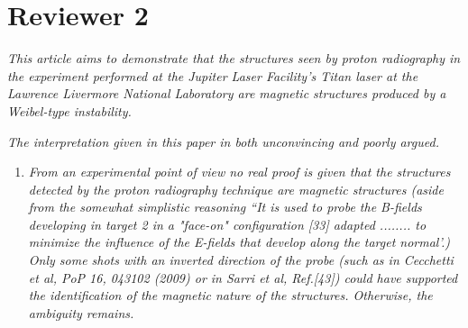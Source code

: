 \documentclass[aps,showpacs,superscriptaddress]{revtex4}%
\begin{document}
\section{Reviewer 2}

\textit{This article aims to demonstrate that the structures seen by proton radiography in the experiment performed at the Jupiter Laser Facility's Titan laser at the Lawrence Livermore National Laboratory are magnetic structures produced by a Weibel-type instability.}

\textit{
The interpretation given in this paper in both unconvincing and poorly argued.}
\begin{enumerate}
\item \textit{From an experimental point of view no real proof is given that the structures detected by the proton radiography technique are magnetic structures (aside from the somewhat simplistic reasoning ``It is used to probe the B-fields developing in target 2 in a "face-on" configuration [33] adapted ........ to minimize the influence of the E-fields that develop along the target normal'.)
Only some shots with an inverted direction of the probe (such as in Cecchetti et al, PoP 16, 043102 (2009) or in Sarri et al, Ref.[43]) could have supported the identification of the magnetic nature of the structures. Otherwise, the ambiguity remains. }



\end{enumerate}
\end{document}
